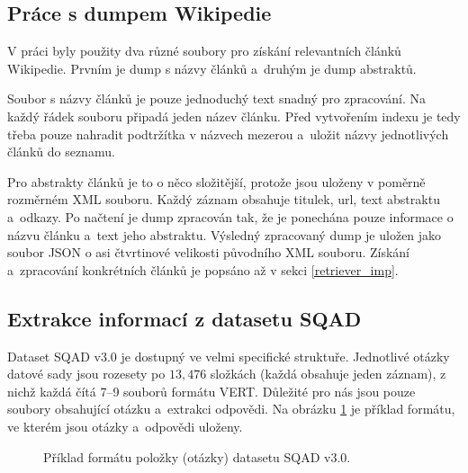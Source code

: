 \subsection{Práce s dumpem Wikipedie}
V práci byly použity dva různé soubory pro získání relevantních článků Wikipedie. Prvním je dump s názvy článků a~druhým je dump abstraktů.\par
Soubor s názvy článků je pouze jednoduchý text snadný pro zpracování. Na každý řádek souboru připadá jeden název článku. Před vytvořením indexu je tedy třeba pouze nahradit podtržítka v názvech mezerou a~uložit názvy jednotlivých článků do seznamu.\par
Pro abstrakty článků je to o něco složitější, protože jsou uloženy v poměrně rozměrném XML souboru. Každý záznam obsahuje titulek, url, text abstraktu a~odkazy. Po načtení je dump zpracován tak, že je ponechána pouze informace o názvu článku a~text jeho abstraktu. Výsledný zpracovaný dump je uložen jako soubor JSON o asi čtvrtinové velikosti původního XML souboru. Získání a~zpracování konkrétních článků je popsáno až v sekci \ref{retriever_imp}.

\subsection{Extrakce informací z datasetu SQAD}
Dataset SQAD v3.0 \cite{sqad_download} je dostupný ve velmi specifické struktuře. Jednotlivé otázky datové sady jsou rozesety po $13,476$ složkách (každá obsahuje jeden záznam), z nichž každá čítá \mbox{7--9} souborů formátu VERT. Důležité pro nás jsou pouze soubory obsahující otázku a~extrakci odpovědi. Na obrázku \ref{question_format} je příklad formátu, ve kterém jsou otázky a~odpovědi uloženy. 

\begin{figure}[hbt]
	\centering
	\caption{Příklad formátu položky (otázky) datasetu SQAD v3.0.}
	\label{question_format}
\end{figure}

